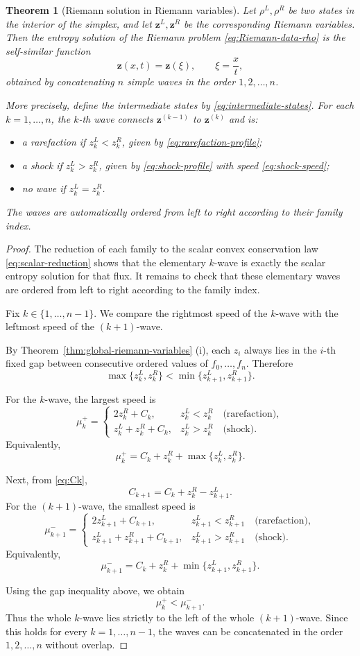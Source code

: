 \documentclass[12pt]{article}
\newtheorem{theorem}{Theorem}
\begin{document}
\begin{theorem}[Riemann solution in Riemann variables]
Let $\rho^L,\rho^R$ be two states in the interior of the simplex, and let $\mathbf{z}^L,\mathbf{z}^R$ be the corresponding Riemann variables. Then the entropy solution of the Riemann problem \eqref{eq:Riemann-data-rho} is the self-similar function
\[
\mathbf{z}(x,t)=\mathbf{z}(\xi),\qquad \xi=\frac{x}{t},
\]
obtained by concatenating $n$ simple waves in the order $1,2,\dots,n$.

More precisely, define the intermediate states by \eqref{eq:intermediate-states}. For each $k=1,\dots,n$, the $k$-th wave connects $\mathbf{z}^{(k-1)}$ to $\mathbf{z}^{(k)}$ and is:
\begin{itemize}
\item a rarefaction if $z_k^L<z_k^R$, given by \eqref{eq:rarefaction-profile};
\item a shock if $z_k^L>z_k^R$, given by \eqref{eq:shock-profile} with speed \eqref{eq:shock-speed};
\item no wave if $z_k^L=z_k^R$.
\end{itemize}
The waves are automatically ordered from left to right according to their family index.
\end{theorem}
\begin{proof}
The reduction of each family to the scalar convex conservation law
\eqref{eq:scalar-reduction} shows that the elementary $k$-wave is exactly
the scalar entropy solution for that flux. It remains to check that these
elementary waves are ordered from left to right according to the family index.

Fix $k\in\{1,\dots,n-1\}$. We compare the rightmost speed of the $k$-wave
with the leftmost speed of the $(k+1)$-wave.

By Theorem~\ref{thm:global-riemann-variables} (i), each $z_i$ always lies in the $i$-th fixed gap
between consecutive ordered values of $f_0,\dots,f_n$. Therefore
\[
\max\{z_k^L,z_k^R\}<\min\{z_{k+1}^L,z_{k+1}^R\}.
\]

For the $k$-wave, the largest speed is
\[
\mu_k^+=
\begin{cases}
2z_k^R+C_k, & z_k^L<z_k^R \quad\text{(rarefaction)},\\[1mm]
z_k^L+z_k^R+C_k, & z_k^L>z_k^R \quad\text{(shock)}.
\end{cases}
\]
Equivalently,
\[
\mu_k^+=C_k+z_k^R+\max\{z_k^L,z_k^R\}.
\]

Next, from \eqref{eq:Ck},
\[
C_{k+1}=C_k+z_k^R-z_{k+1}^L.
\]
For the $(k+1)$-wave, the smallest speed is
\[
\mu_{k+1}^-=
\begin{cases}
2z_{k+1}^L+C_{k+1}, & z_{k+1}^L<z_{k+1}^R \quad\text{(rarefaction)},\\[1mm]
z_{k+1}^L+z_{k+1}^R+C_{k+1}, & z_{k+1}^L>z_{k+1}^R \quad\text{(shock)}.
\end{cases}
\]
Equivalently,
\[
\mu_{k+1}^-=C_k+z_k^R+\min\{z_{k+1}^L,z_{k+1}^R\}.
\]

Using the gap inequality above, we obtain
\[
\mu_k^+<\mu_{k+1}^-.
\]
Thus the whole $k$-wave lies strictly to the left of the whole $(k+1)$-wave.
Since this holds for every $k=1,\dots,n-1$, the waves can be concatenated in
the order $1,2,\dots,n$ without overlap.
\end{proof}
\end{document}
